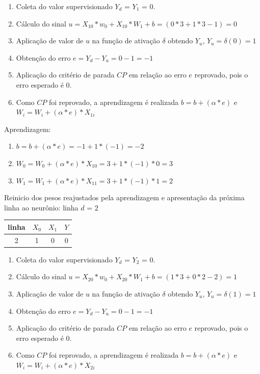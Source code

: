 \documentclass[	12pt, Times, openright, twoside, a4paper, english, brazil]{abntex2}
\begin{document}
    				
    				\begin{enumerate}
    				    \item Coleta do valor supervisionado $Y_d$ = $Y_1$ = 0.
    					\item Cálculo do sinal $u = X_{10}*w_0 + X_{10}*W_1 +b = (0*3 + 1*3 -1) = 0$
    					\item Aplicação de valor de $u$ na função de ativação $\delta$ obtendo $Y_u$, $Y_u = \delta(0) = 1$
    					\item Obtenção do erro $e = Y_d-Y_u = 0 - 1 = -1$
    					\item Aplicação do critério de parada $CP$ em relação ao erro $e$ reprovado, pois o erro esperado é 0.
    					\item Como $CP$ foi reprovado, a aprendizagem é realizada $b=b+(\alpha*e)$ e $W_i=W_i + (\alpha*e)*X_{1i}$
    				\end{enumerate}
    				
    				Aprendizagem:
    				\begin{enumerate}
    					\item $b=b+(\alpha*e) = -1 + 1*(-1) = -2 $  					
    					\item $W_0=W_0 + (\alpha*e)*X_{10} = 3 + 1*(-1)*0 = 3$ 
    					\item $W_1=W_1 + (\alpha*e)*X_{11} = 3 + 1*(-1)*1 = 2$
    				\end{enumerate}
    				
    				Reinicio dos pesos reajustados pela aprendizagem e apresentação da próxima linha ao neurônio:
    				linha $d$ = 2\\
    				\begin{table}[!ht]
                    \centering
    				\begin{tabular}{|c|c|c|c|}
    					\hline  \textbf{linha} & \textbf{$X_0$} & \textbf{$X_1$} &  \textbf{$Y$}\\
  				 	    \hline 2 & 1 & 0 & 0\\ \hline
    				\end{tabular}
    				\end{table}
            	
            	
            	\begin{enumerate}
            	    \item Coleta do valor supervisionado $Y_d$ = $Y_2$ = 0.
            		\item Cálculo do sinal $u = X_{20}*w_0 + X_{20}*W_1 +b = (1*3 + 0*2 -2) = 1$
            		\item Aplicação de valor de $u$ na função de ativação $\delta$ obtendo $Y_u$, $Y_u = \delta(1) = 1$
            		\item Obtenção do erro $e = Y_d-Y_u = 0 - 1 = -1$
            		\item Aplicação do critério de parada $CP$ em relação ao erro $e$ reprovado, pois o erro esperado é 0.
    				\item Como $CP$ foi reprovado, a aprendizagem é realizada $b=b+(\alpha*e)$ e $W_i=W_i + (\alpha*e)*X_{2i}$
            	\end{enumerate}
            
\end{document}
